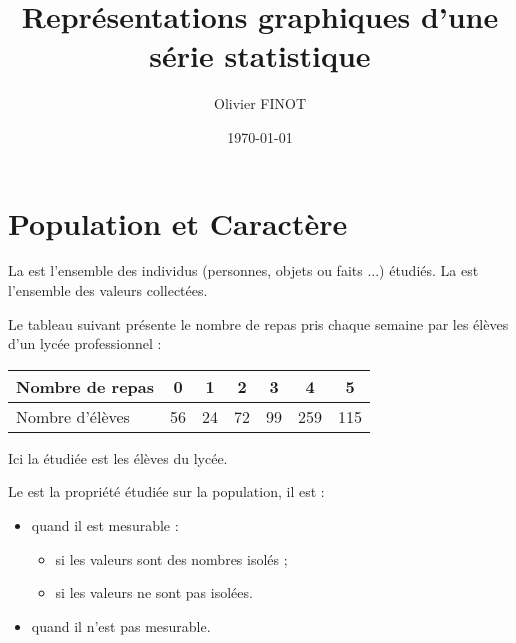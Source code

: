 \documentclass[12pt,a4paper]{article}
\author{Olivier FINOT}
\date{\today}
\title{Représentations graphiques d'une série statistique }
\begin{document}
\maketitle

\section{Population et Caractère}

\begin{mydefs}
La  est l'ensemble des individus (personnes, objets ou faits ...) étudiés.
La  est l'ensemble des valeurs collectées.
\end{mydefs}


\begin{myex}
	
	Le tableau suivant présente le nombre de repas pris chaque semaine par les élèves d'un lycée professionnel :
	
	\begin{center}
		\begin{tabular}{|@{\ }l@{\ }|@{\ }c@{\ }|@{\ }c@{\ }|@{\ }c@{\ }|@{\ }c@{\ }|@{\ }c@{\ }|@{\ }c@{\ }|}
			\hline
			Nombre de repas & 0 & 1 & 2 & 3 & 4 & 5 \\ \hline
			Nombre d'élèves & 56 & 24 & 72 & 99 & 259 & 115 \\ \hline
		\end{tabular}
	\end{center}
	
	Ici la  étudiée est les élèves du lycée.
\end{myex}


\begin{mydef}

Le  est la propriété étudiée sur la population, il est :
\begin{itemize}
	\item {} quand il est mesurable :
		\begin{itemize}
			\item {} si les valeurs sont des nombres isolés ;
			\item {} si les valeurs ne sont pas isolées. %
		\end{itemize}
	\item {} quand il n'est pas mesurable. %
\end{itemize}
\end{mydef}
\end{document}
